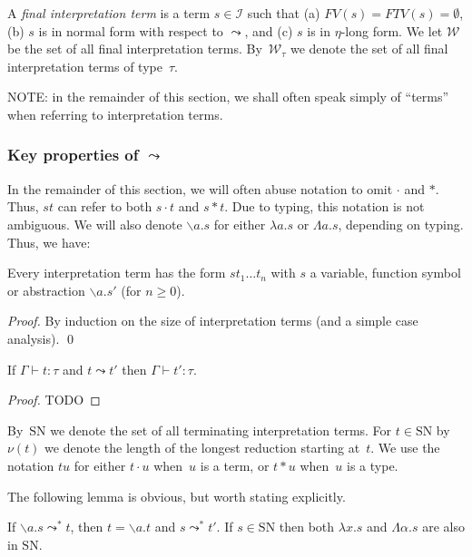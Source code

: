 \documentclass[runningheads,a4paper]{llncs}
\newcommand{\Iterms}{\mathcal{I}}
\newcommand{\World}{\mathcal{W}}
\newcommand{\abs}[2]{\lambda #1.#2}
\newcommand{\tabs}[2]{\Lambda #1.#2}
\newcommand{\abstraction}[2]{\backslash #1.#2}
\newcommand{\app}[2]{#1 \cdot #2}
\newcommand{\tapp}[2]{#1 * #2}
\newcommand{\FTV}{\mathit{FTV}}
\newcommand{\FV}{\mathit{FV}}
\newcommand{\SN}{\mathrm{SN}}
\begin{document}
\begin{definition}
A \emph{final interpretation term} is a term $s \in \Iterms$ such that
(a) $\FV(s) = \FTV(s) = \emptyset$, (b) $s$ is in normal form with
respect to $\leadsto$, and (c) $s$ is in $\eta$-long form.  We let
$\World$ be the set of all final interpretation terms. By~$\World_\tau$
we denote the set of all final interpretation terms of type~$\tau$.
\end{definition}

NOTE: in the remainder of this section, we shall often speak simply of
``terms'' when referring to interpretation terms.

\subsubsection{Key properties of $\leadsto$}
In the remainder of this section, we will often abuse notation to omit
$\cdot$ and $*$.  Thus, $s t$ can refer to both $\app{s}{t}$ and
$\tapp{s}{t}$.  Due to typing, this notation is not ambiguous.  We will
also denote $\abstraction{a}{s}$ for either $\abs{a}{s}$ or
$\tabs{a}{s}$, depending on typing.  Thus, we have:

\begin{lemma}\label{lem_abusive_notation}
Every interpretation term has the form $s t_1 \dots t_n$ with
$s$ a variable, function symbol or abstraction $\abstraction{a}{s'}$
(for $n \geq 0$).
\end{lemma}

\begin{proof}
By induction on the size of interpretation terms (and a simple case
analysis).
\qed
\end{proof}

\begin{lemma}
  If $\Gamma \vdash t : \tau$ and $t \leadsto t'$ then
  $\Gamma \vdash t' : \tau$.
\end{lemma}

\begin{proof}
  TODO
\end{proof}

By~$\SN$ we denote the set of all terminating interpretation
terms. For $t \in \SN$ by~$\nu(t)$ we denote the length of the longest
reduction starting at~$t$. We use the notation $t u$ for either
$\app{t}{u}$ when~$u$ is a term, or $\tapp{t}{u}$ when~$u$ is a type.

The following lemma is obvious, but worth stating explicitly.

\begin{lemma}\label{lem_reduce_abs}
If $\abstraction{a}{s} \leadsto^* t$, then $t = \abstraction{a}{
t}$ and $s \leadsto^* t'$.
If $s \in \SN$ then both $\abs{x}{s}$ and $\tabs{\alpha}{s}$ are also
in $\SN$.
\end{lemma}
\end{document}
